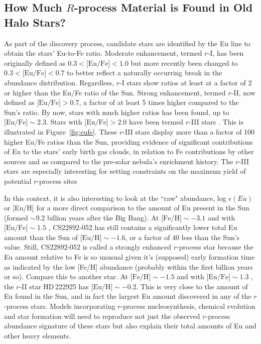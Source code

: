 \documentclass[letterpaper]{article}
\begin{document}
\subsection{How Much $R$-process Material is Found in Old Halo Stars?}

As part of the discovery process, candidate stars are identified by the Eu line to obtain the stars' Eu-to-Fe ratio. Moderate enhancement, termed $r$-I, has been originally defined as $0.3<\mbox{[Eu/Fe]}<1.0$ \citep{Beers05} but more recently been changed to $0.3<\mbox{[Eu/Fe]}<0.7$ \citep{holmbeck20} to better reflect a naturally occurring break in the abundance distribution. Regardless, $r$-I stars show ratios at least at a factor of 2 or higher than the Eu/Fe ratio of the Sun. Strong enhancement, termed $r$-II, now defined as $\mbox{[Eu/Fe]}>0.7$, a factor of at least 5 times higher compared to the Sun's ratio. By now, stars with much higher ratios has been found, up to $\mbox{[Eu/Fe]}\sim2.3$. Stars with $\mbox{[Eu/Fe]}>2.0$ have been termed $r$-III stars \citep{cain20, ezzeddine20}.  This is illustrated in Figure~\ref{fig:eufe}. These $r$-III stars display more than a factor of 100 higher Eu/Fe ratios than the Sun, providing evidence of significant contributions of Eu to the stars' early birth gas clouds, in relation to Fe contributions by other sources and as compared to the pre-solar nebula's enrichment history. The $r$-III stars are especially interesting for setting constraints on the maximum yield of potential $r$-process sites \citep[e.g.,][]{Macias2018,Macias2019,Siegel2021}

In this context, it is also interesting to look at the ``raw" abundance, log $\epsilon(Eu)$ or [Eu/H] for a more direct comparison to the amount of Eu present in the Sun (formed $\sim$9.2 billion years after the Big Bang). 
At $\mbox{[Fe/H]}\sim-3.1$ and with $\mbox{[Eu/Fe]}\sim1.5$ \citep{sneden2000}, CS22892-052 has still contains a significantly lower total Eu amount than the Sun of $\mbox{[Eu/H]}\sim-1.6$, or a factor of 40 less than the Sun's value. Still, CS22892-052 is called a strongly enhanced $r$-process star because the Eu amount relative to Fe is so unusual given it's (supposed) early formation time as indicated by the low [Fe/H] abundance (probably within the first billion years or so). Compare this to another star. At $\mbox{[Fe/H]}\sim-1.5$ and with $\mbox{[Eu/Fe]}\sim1.3$ \citep{Roederer18_hd}, the $r$-II star HD\,222925 has $\mbox{[Eu/H]}\sim-0.2$. This  is very close to the amount of Eu found in the Sun, and in fact the largest Eu amount discovered in any of the $r$-process stars. Models incorporating $r$-process nucleosynthesis, chemical evolution and star formation will need  to reproduce not just the observed $r$-process abundance signature of these stars but also explain their total amounts of Eu and other heavy elements. 
\end{document}
